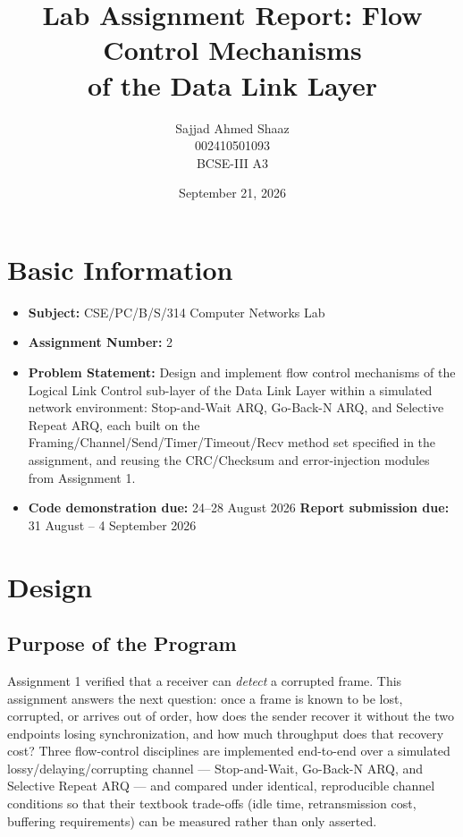 \documentclass[11pt]{article}
\title{\Large\textbf{Lab Assignment Report: Flow Control Mechanisms\\ of the Data Link Layer}}
\author{Sajjad Ahmed Shaaz \\ 002410501093 \\ BCSE-III A3}
\date{September 21, 2026}
\begin{document}
\maketitle

\section*{Basic Information}
\begin{itemize}[leftmargin=1.6em]
  \item \textbf{Subject:} CSE/PC/B/S/314 Computer Networks Lab
  \item \textbf{Assignment Number:} 2
  \item \textbf{Problem Statement:} Design and implement flow control mechanisms of the
  Logical Link Control sub-layer of the Data Link Layer within a simulated network
  environment: Stop-and-Wait ARQ, Go-Back-N ARQ, and Selective Repeat ARQ, each built on
  the Framing/Channel/Send/Timer/Timeout/Recv method set specified in the assignment, and
  reusing the CRC/Checksum and error-injection modules from Assignment 1.
  \item \textbf{Code demonstration due:} 24--28 August 2026 \quad
  \textbf{Report submission due:} 31 August -- 4 September 2026
\end{itemize}

\section{Design}

\subsection{Purpose of the Program}
Assignment 1 verified that a receiver can \emph{detect} a corrupted frame. This assignment
answers the next question: once a frame is known to be lost, corrupted, or arrives out of
order, how does the sender recover it without the two endpoints losing synchronization, and
how much throughput does that recovery cost? Three flow-control disciplines are implemented
end-to-end over a simulated lossy/delaying/corrupting channel — Stop-and-Wait, Go-Back-N
ARQ, and Selective Repeat ARQ — and compared under identical, reproducible channel
conditions so that their textbook trade-offs (idle time, retransmission cost, buffering
requirements) can be measured rather than only asserted.
\end{document}

